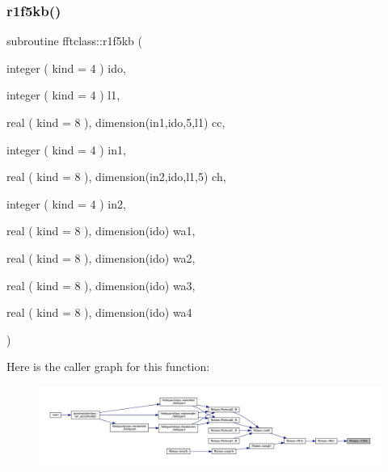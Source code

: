 \subsubsection{\texorpdfstring{r1f5kb()}{r1f5kb()}}
{\footnotesize\ttfamily subroutine fftclass\+::r1f5kb (\begin{DoxyParamCaption}\item[{integer ( kind = 4 )}]{ido,  }\item[{integer ( kind = 4 )}]{l1,  }\item[{real ( kind = 8 ), dimension(in1,ido,5,l1)}]{cc,  }\item[{integer ( kind = 4 )}]{in1,  }\item[{real ( kind = 8 ), dimension(in2,ido,l1,5)}]{ch,  }\item[{integer ( kind = 4 )}]{in2,  }\item[{real ( kind = 8 ), dimension(ido)}]{wa1,  }\item[{real ( kind = 8 ), dimension(ido)}]{wa2,  }\item[{real ( kind = 8 ), dimension(ido)}]{wa3,  }\item[{real ( kind = 8 ), dimension(ido)}]{wa4 }\end{DoxyParamCaption})}

Here is the caller graph for this function\+:\nopagebreak
\begin{figure}[H]
\begin{center}
\leavevmode
\includegraphics[width=350pt]{namespacefftclass_a42f5de07f4eb994cbe15a8526291566b_icgraph}
\end{center}
\end{figure}
\mbox{\label{namespacefftclass_acc419931cfa3ec3e19e6264b35e83aae}} 
